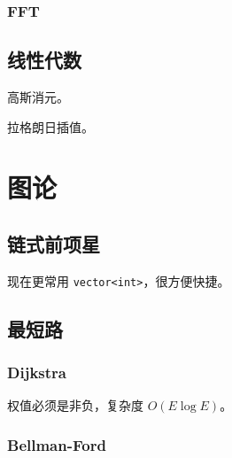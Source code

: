 \documentclass{probook}
\begin{document}
\begin{multicols}{2}


\subsection{FFT}



\section{线性代数}

高斯消元。



拉格朗日插值。








\chapter{图论}

\section{链式前项星}

现在更常用 \lstinline{vector<int>}，很方便快捷。



\section{最短路}

\subsection{Dijkstra}

权值必须是非负，复杂度 $O(E\log E)$。



\subsection{Bellman-Ford}


\end{multicols}
\end{document}
